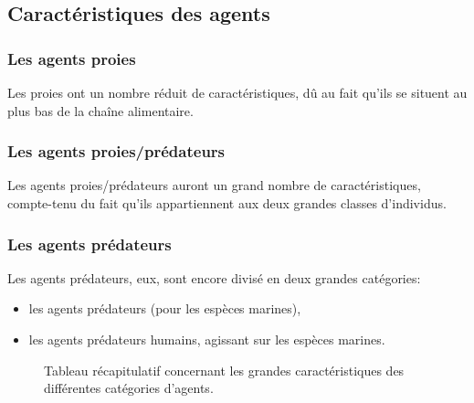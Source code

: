 \subsection{Caractéristiques des agents}

\subsubsection{Les agents proies}

Les proies ont un nombre réduit de caractéristiques, dû au fait qu'ils se situent au plus bas de la chaîne alimentaire.

\subsubsection{Les agents proies/prédateurs}

Les agents proies/prédateurs auront un grand nombre de caractéristiques, compte-tenu du fait qu'ils appartiennent aux deux grandes classes d'individus.

\subsubsection{Les agents prédateurs}

Les agents prédateurs, eux, sont encore divisé en deux grandes catégories:
\begin{itemize}
	\item{les agents prédateurs (pour les espèces marines),}
	\item{les agents prédateurs humains, agissant sur les espèces marines.}
\end{itemize}

\begin{figure}[h]
\begin{center}
\end{center}

\caption{Tableau récapitulatif concernant les grandes caractéristiques des différentes catégories d'agents.}
\label{fig:recap_caracteristics}
\end{figure}

